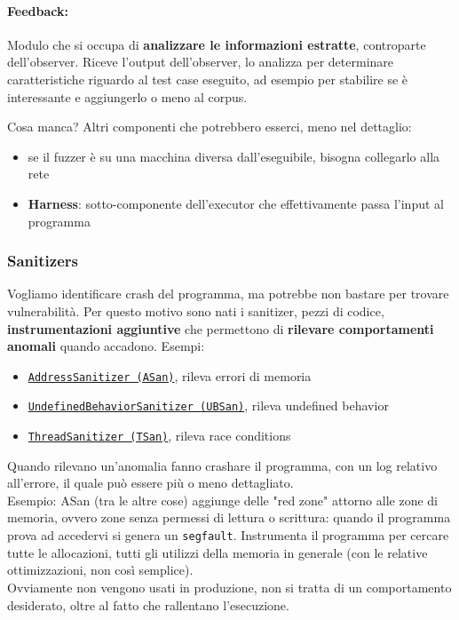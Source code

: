 \paragraph{Feedback:} Modulo che si occupa di \textbf{analizzare le informazioni estratte}, controparte dell'observer. Riceve l'output dell'observer, lo analizza per determinare caratteristiche riguardo al test case eseguito, ad esempio per stabilire se è interessante e aggiungerlo o meno al corpus.\\

\newpage

Cosa manca? Altri componenti che potrebbero esserci, meno nel dettaglio: 
\begin{itemize}
	\item se il fuzzer è su una macchina diversa dall'eseguibile, bisogna collegarlo alla rete
	\item \textbf{Harness}: sotto-componente dell'executor che effettivamente passa l'input al programma
\end{itemize}

\subsubsection{Sanitizers}

Vogliamo identificare crash del programma, ma potrebbe non bastare per trovare vulnerabilità. Per questo motivo sono nati i sanitizer, pezzi di codice, \textbf{instrumentazioni aggiuntive} che permettono di \textbf{rilevare comportamenti anomali} quando accadono. Esempi: 
\begin{itemize}
	\item \href{https://github.com/google/sanitizers/wiki/addresssanitizer}{\texttt{AddressSanitizer (ASan)}}, rileva errori di memoria
	\item \href{https://docs.kernel.org/dev-tools/ubsan.html}{\texttt{UndefinedBehaviorSanitizer (UBSan)}}, rileva undefined behavior
	\item \href{https://github.com/google/sanitizers/wiki/threadsanitizercppmanual}{\texttt{ThreadSanitizer (TSan)}}, rileva race conditions
\end{itemize}

Quando rilevano un'anomalia fanno crashare il programma, con un log relativo all'errore, il quale può essere più o meno dettagliato.\\

Esempio: ASan (tra le altre cose) aggiunge delle "red zone" attorno alle zone di memoria, ovvero zone senza permessi di lettura o scrittura: quando il programma prova ad accedervi si genera un \texttt{segfault}. Instrumenta il programma per cercare tutte le allocazioni, tutti gli utilizzi della memoria in generale (con le relative ottimizzazioni, non così semplice).\\
Ovviamente non vengono usati in produzione, non si tratta di un comportamento desiderato, oltre al fatto che rallentano l'esecuzione.\\

